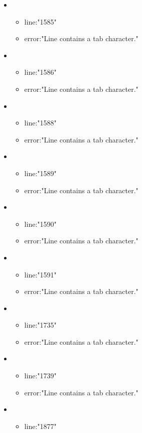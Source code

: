 \begin{itemize}
	\item 
	\begin{itemize} 
		\item line:"1585" 
		\item error:"Line contains a tab character." 
	\end{itemize}
	\item 
	\begin{itemize} 
		\item line:"1586" 
		\item error:"Line contains a tab character." 
	\end{itemize}
	\item 
	\begin{itemize} 
		\item line:"1588" 
		\item error:"Line contains a tab character." 
	\end{itemize}
	\item 
	\begin{itemize} 
		\item line:"1589" 
		\item error:"Line contains a tab character." 
	\end{itemize}
	\item 
	\begin{itemize} 
		\item line:"1590" 
		\item error:"Line contains a tab character." 
	\end{itemize}
	\item 
	\begin{itemize} 
		\item line:"1591" 
		\item error:"Line contains a tab character." 
	\end{itemize}
	\item 
	\begin{itemize} 
		\item line:"1735" 
		\item error:"Line contains a tab character." 
	\end{itemize}
	\item 
	\begin{itemize} 
		\item line:"1739" 
		\item error:"Line contains a tab character." 
	\end{itemize}
	\item 
	\begin{itemize} 
		\item line:"1877" 

\end{itemize}
\end{itemize}
